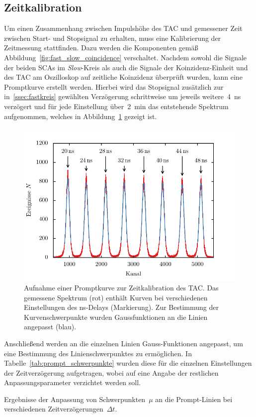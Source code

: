 \documentclass[11pt, a4paper]{article}
\numberwithin{equation}{section}
\begin{document}
\subsection{Zeitkalibration}
\label{sec:zeitkalibration}
Um einen Zusammenhang zwischen Impulshöhe des TAC und gemessener Zeit zwischen Start- und Stopsignal zu erhalten, muss eine Kalibrierung der Zeitmessung stattfinden.
Dazu werden die Komponenten gemäß Abbildung~\ref{fig:fast_slow_coincidence} verschaltet.
Nachdem sowohl die Signale der beiden SCAs im \textit{Slow}-Kreis als auch die Signale der Koinzidenz-Einheit und des TAC am Oszilloskop auf zeitliche Koinzidenz überprüft wurden, kann eine Promptkurve erstellt werden.
Hierbei wird das Stopsignal zusätzlich zur in~\ref{ssec:fastkreis} gewählten Verzögerung schrittweise um jeweils weitere~\SI{4}{ns} verzögert und für jede Einstellung über~\SI{2}{min} das entstehende Spektrum aufgenommen, welches in Abbildung~\ref{fig:promptkurven} gezeigt ist.
\begin{figure}[h]
	\centering
	\includegraphics{./figures/prompt_curve_fits.pdf}
	\caption{Aufnahme einer Promptkurve zur Zeitkalibration des TAC. Das gemessene Spektrum (rot) enthält Kurven bei verschiedenen Einstellungen des \si{ns}-Delays (Markierung). Zur Bestimmung der Kurvenschwerpunkte wurden Gaussfunktionen an die Linien angepasst (blau).}
	\label{fig:promptkurven}
\end{figure}
Anschließend werden an die einzelnen Linien Gauss-Funktionen angepasst, um eine Bestimmung des Linienschwerpunktes zu ermöglichen.
In Tabelle~\ref{tab:prompt_schwerpunkte} wurden diese für die einzelnen Einstellungen der Zeitverzögerung aufgetragen, wobei auf eine Angabe der restlichen Anpassungsparameter verzichtet werden soll.
\begin{table}[h]
	\centering
	
	\caption{Ergebnisse der Anpassung von Schwerpunkten~$\mu$ an die Prompt-Linien bei verschiedenen Zeitverzögerungen~$\Delta t$.}
	\label{tab:prompt_schwerpunkte}
\end{table}
\end{document}
